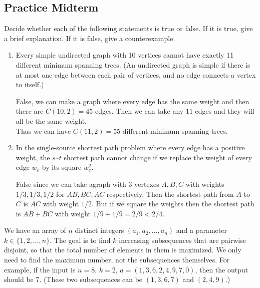 \documentclass[answers,12pt,addpoints]{exam}
\begin{document}
\begin{questions}
\section{Practice Midterm}
Decide whether each of the following statements is true or false. If it is true, give a brief explanation. If it is false, give a counterexample.
\begin{enumerate}
    \item Every simple undirected graph with 10 vertices cannot have exactly 11 different minimum spanning trees. (An undirected graph is simple if there is at most one edge between each pair of vertices, and no edge connects a vertex to itself.)
    \begin{solution}
        False, we can make a graph where every edge has the same weight and then there are $C(10,2) = 45$ edges. Then we can take any $11$ edges and they will all be the same weight.\\
        Thus we can have $C(11,2) = 55$ different minimum spanning trees.
    \end{solution}
    \item In the single-source shortest path problem where every edge has a positive weight, the $s$–$t$ shortest path cannot change if we replace the weight of every edge $w_e$ by its square $w_e^2$.
    \begin{solution}
        False since we can take agraph with 3 vertexes $A,B,C$ with weights $1/3, 1/3, 1/2$ for $AB, BC, AC$ respectively. Then the shortest path from $A$ to $C$ is $AC$ with weight $1/2$. But if we square the weights then the shortest path is $AB + BC$ with weight $1/9 + 1/9 = 2/9 < 2/4$.

    \end{solution}
\end{enumerate}
We have an array of $n$ distinct integers $(a_1, a_2, \dots, a_n)$ and a parameter $k \in \{1, 2, \dots, n\}$. The goal is to find $k$ increasing subsequences that are pairwise disjoint, so that the total number of elements in them is maximized. We only need to find the maximum number, not the subsequences themselves. For example, if the input is $n = 8$, $k = 2$, $a = (1, 3, 6, 2, 4, 9, 7, 0)$, then the output should be $7$. (These two subsequences can be $(1, 3, 6, 7)$ and $(2, 4, 9)$.)


\end{questions}
\end{document}
